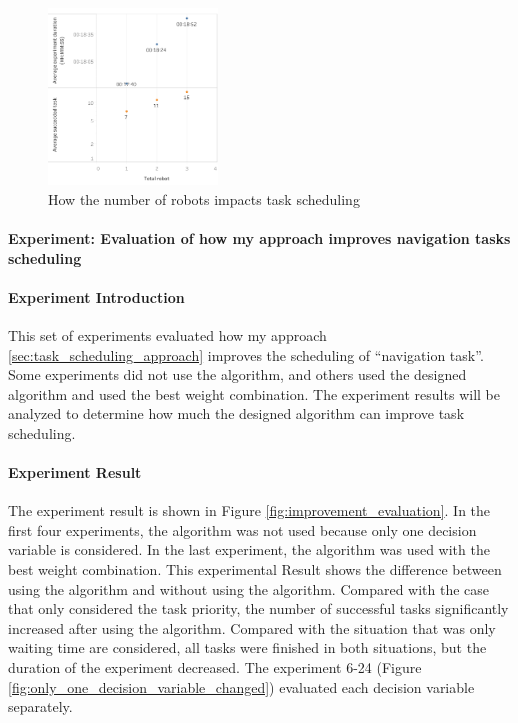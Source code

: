 \begin{figure}
 \centering
 \includegraphics[width = 0.4\textwidth]{content/images/ch5/different_number_of_robots.png}
 \caption{How the number of robots impacts task scheduling}
 \label{fig:different_number_of_robot}
\end{figure}

\paragraph{Experiment: Evaluation of how my approach improves navigation tasks scheduling}

\paragraph{Experiment Introduction} 
This set of experiments evaluated how my approach \ref{sec:task_scheduling_approach} improves the scheduling of ``navigation task''. Some experiments did not use the algorithm, and others used the designed algorithm and used the best weight combination. The experiment results will be analyzed to determine how much the designed algorithm can improve task scheduling.

\paragraph{Experiment Result} 
The experiment result is shown in Figure \ref{fig:improvement_evaluation}. In the first four experiments, the algorithm was not used because only one decision variable is considered. In the last experiment, the algorithm was used with the best weight combination.
 This experimental Result shows the difference between using the algorithm and without using the algorithm. Compared with the case that only considered the task priority, the number of successful tasks significantly increased after using the algorithm. Compared with the situation that was only waiting time are considered, all tasks were finished in both situations, but the duration of the experiment decreased. 
The experiment 6-24 (Figure \ref{fig:only_one_decision_variable_changed}) evaluated each decision variable separately.

